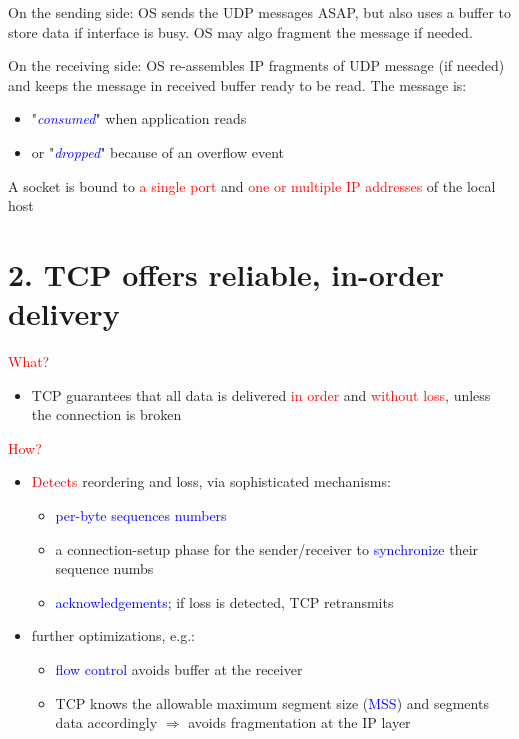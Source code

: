 \documentclass[11pt]{article}
\begin{document}
On the sending side: OS sends the UDP messages ASAP, but also uses a buffer to store data if interface is busy. OS may algo fragment the message if needed.

On the receiving side: OS re-assembles IP fragments of UDP message (if needed) and keeps the message in received buffer ready to be read. The message is: 
\begin{itemize}
	\item "\textcolor{blue}{\textit{consumed}}" when application reads
	\item or "\textcolor{blue}{\textit{dropped}}" because of an overflow event
\end{itemize}

A socket is bound to \textcolor{red}{a single port} and \textcolor{red}{one or multiple IP addresses} of the local host
\section*{2. TCP offers reliable, in-order delivery}

\textcolor{red}{What?}
\begin{itemize}
	\item TCP guarantees that all data is delivered \textcolor{red}{in order} and \textcolor{red}{without loss}, unless the connection is broken
\end{itemize}

\textcolor{red}{How?}
\begin{itemize}
	\item \textcolor{red}{Detects} reordering and loss, via sophisticated mechanisms:
		\begin{itemize}
			\item \textcolor{blue}{per-byte sequences numbers} 
			\item a connection-setup phase for the sender/receiver to \textcolor{blue}{synchronize} their sequence numbs
			\item \textcolor{blue}{acknowledgements}; if loss is detected, TCP retransmits
		\end{itemize}
	\item further optimizations, e.g.: 
		\begin{itemize}
			\item \textcolor{blue}{flow control} avoids buffer at the receiver
			\item TCP knows the allowable maximum segment size (\textcolor{blue}{MSS}) and segments data accordingly $\Rightarrow$ avoids fragmentation at the IP layer
		\end{itemize}
\end{itemize}
\end{document}
